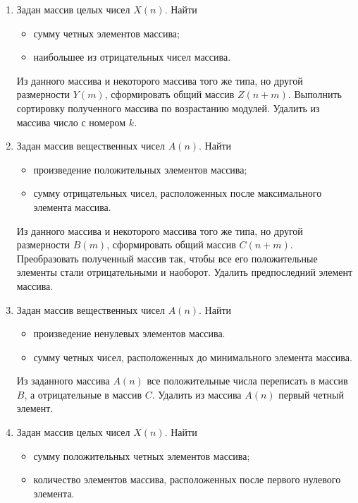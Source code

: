 \begin{enumerate}
\item Задан массив целых чисел $X(n)$. Найти
\begin{itemize}
\item сумму четных элементов массива;
\item наибольшее из отрицательных чисел массива.
\end{itemize}

Из данного массива и некоторого массива того же типа, но другой размерности $Y(m)$,
сформировать общий массив $Z(n+m)$. Выполнить сортировку полученного массива по
возрастанию модулей. Удалить из массива число с номером $k$.
\item Задан массив вещественных чисел $A(n)$. Найти 
\begin{itemize}
\item произведение положительных элементов массива;
\item сумму отрицательных чисел, расположенных после максимального элемента массива.
\end{itemize}

Из данного массива и некоторого массива того же типа, но другой размерности $B(m)$,
сформировать общий массив $C(n+m)$. Преобразовать полученный массив так, чтобы все
его положительные элементы стали отрицательными и наоборот. Удалить предпоследний элемент массива.
\item Задан массив вещественных чисел $A(n)$. Найти
\begin{itemize}
\item произведение ненулевых элементов массива.
\item сумму четных чисел, расположенных до минимального элемента массива.
\end{itemize}

Из заданного массива $A(n)$ все положительные числа переписать в массив $B$, а
отрицательные в массив $C$. Удалить из массива $A(n)$ первый четный элемент.

\item Задан массив целых чисел $X(n)$. Найти
\begin{itemize}
\item сумму положительных четных элементов массива;
\item количество элементов массива, расположенных после первого нулевого элемента.
\end{itemize}


\end{enumerate}

